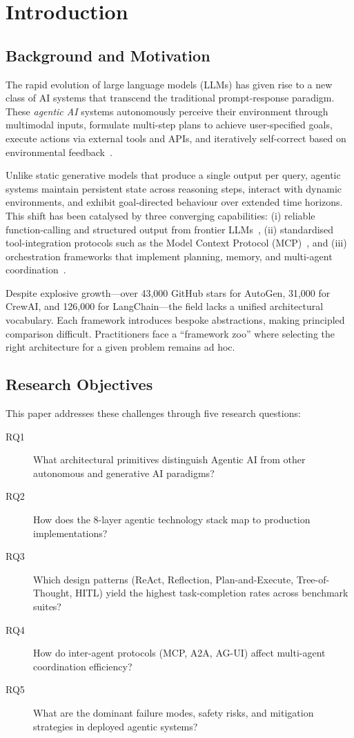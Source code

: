 \documentclass[12pt, a4paper]{article}
\begin{document}
\section{Introduction}\label{sec:intro}

\subsection{Background and Motivation}
The rapid evolution of large language models (LLMs) has given rise to a new class of AI systems that transcend the traditional prompt-response paradigm. These \emph{agentic AI} systems autonomously perceive their environment through multimodal inputs, formulate multi-step plans to achieve user-specified goals, execute actions via external tools and APIs, and iteratively self-correct based on environmental feedback~\citep{yao2023react, shinn2023reflexion, wang2024survey}.

Unlike static generative models that produce a single output per query, agentic systems maintain persistent state across reasoning steps, interact with dynamic environments, and exhibit goal-directed behaviour over extended time horizons. This shift has been catalysed by three converging capabilities: (i) reliable function-calling and structured output from frontier LLMs~\citep{openai2024gpt4o, anthropic2024claude}, (ii) standardised tool-integration protocols such as the Model Context Protocol (MCP)~\citep{anthropic2024mcp}, and (iii) orchestration frameworks that implement planning, memory, and multi-agent coordination~\citep{langchain2024langgraph, microsoft2024autogen}.

Despite explosive growth---over 43,000 GitHub stars for AutoGen, 31,000 for CrewAI, and 126,000 for LangChain---the field lacks a unified architectural vocabulary. Each framework introduces bespoke abstractions, making principled comparison difficult. Practitioners face a ``framework zoo'' where selecting the right architecture for a given problem remains ad hoc.

\subsection{Research Objectives}
This paper addresses these challenges through five research questions:

\begin{description}
    \item[RQ1] What architectural primitives distinguish Agentic AI from other autonomous and generative AI paradigms?
    \item[RQ2] How does the 8-layer agentic technology stack map to production implementations?
    \item[RQ3] Which design patterns (ReAct, Reflection, Plan-and-Execute, Tree-of-Thought, HITL) yield the highest task-completion rates across benchmark suites?
    \item[RQ4] How do inter-agent protocols (MCP, A2A, AG-UI) affect multi-agent coordination efficiency?
    \item[RQ5] What are the dominant failure modes, safety risks, and mitigation strategies in deployed agentic systems?
\end{description}
\end{document}
